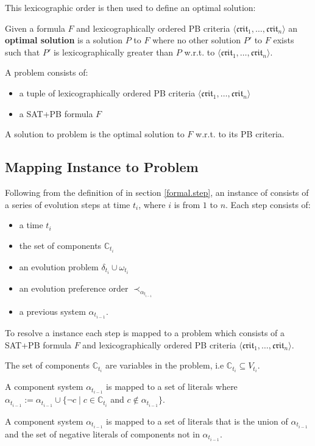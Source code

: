 This lexicographic order is then used to define an optimal solution:
\begin{defs}
Given a formula $F$ and lexicographically ordered PB criteria $\langle \mathfrak{crit}_1,\ldots,\mathfrak{crit}_n \rangle$
an \textbf{optimal solution} is a solution $P$ to $F$ 
where no other solution $P'$ to $F$ exists such that $P'$ is lexicographically greater than $P$ w.r.t. to $\langle \mathfrak{crit}_1,\ldots,\mathfrak{crit}_n \rangle$. 
\end{defs}

A \modelimpl problem consists of:
\begin{itemize}
  \item a tuple of lexicographically ordered PB criteria $\langle \mathfrak{crit}_1,\ldots,\mathfrak{crit}_n \rangle$
  \item a SAT+PB formula $F$
\end{itemize}
A solution to \modelimpl problem is the optimal solution to $F$ w.r.t. to its PB criteria.

\subsection{Mapping \modelname Instance to \modelimpl Problem}
\label{impl.mapping}
Following from the definition of \modelname in section \ref{formal.step}, 
an instance of \modelname consists of a series of evolution steps at time $t_i$, where $i$ is from $1$ to $n$.
Each step consists of:
\begin{itemize}
  \item a time $t_i$
  \item the set of components $\mathbb{C}_{t_i}$ 
  \item an evolution problem $\delta_{t_i} \cup \omega_{t_i}$
  \item an evolution preference order $\prec_{\alpha_{t_{i-1}}}$
  \item a previous system $\alpha_{t_{i-1}}$.
\end{itemize}

To resolve a \modelname instance each step is mapped to a \modelimpl problem which consists of a SAT+PB formula $F$ 
and lexicographically ordered PB criteria $\langle \mathfrak{crit}_1,\ldots,\mathfrak{crit}_n \rangle$.

The set of components $\mathbb{C}_{t_i}$ are variables in the problem, i.e $\mathbb{C}_{t_i} \subseteq V_{t_i}$.

\begin{defs}
	A component system $\alpha_{t_{i-1}}$ is mapped to a set of literals where
   $\alpha_{t_{i-1}} := \alpha_{t_{i-1}} \cup \{\neg c \mid c \in \mathbb{C}_{t_i}$ and $ c \not \in \alpha_{t_{i-1}}\}$.
\end{defs}
A component system $\alpha_{t_{i-1}}$ is mapped to a set of literals that is the union of $\alpha_{t_{i-1}}$ and the set of negative literals of components not in $\alpha_{t_{i-1}}$.

